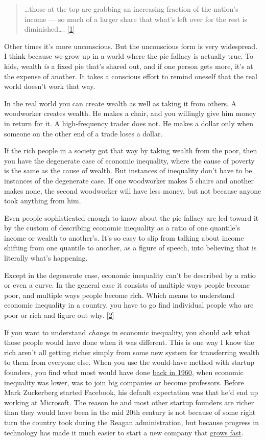 \begin{quote}
\ldots those at the top are grabbing an increasing fraction of the
nation's income --- so much of a larger share that what's left over for
the rest is diminished\ldots. {[}\hyperref[f1n]{1}{]}
\end{quote}

Other times it's more unconscious. But the unconscious form is very
widespread. I think because we grow up in a world where the pie fallacy
is actually true. To kids, wealth \emph{is} a fixed pie that's shared
out, and if one person gets more, it's at the expense of another. It
takes a conscious effort to remind oneself that the real world doesn't
work that way.

In the real world you can create wealth as well as taking it from
others. A woodworker creates wealth. He makes a chair, and you willingly
give him money in return for it. A high-frequency trader does not. He
makes a dollar only when someone on the other end of a trade loses a
dollar.

If the rich people in a society got that way by taking wealth from the
poor, then you have the degenerate case of economic inequality, where
the cause of poverty is the same as the cause of wealth. But instances
of inequality don't have to be instances of the degenerate case. If one
woodworker makes 5 chairs and another makes none, the second woodworker
will have less money, but not because anyone took anything from him.

Even people sophisticated enough to know about the pie fallacy are led
toward it by the custom of describing economic inequality as a ratio of
one quantile's income or wealth to another's. It's so easy to slip from
talking about income shifting from one quantile to another, as a figure
of speech, into believing that is literally what's happening.

Except in the degenerate case, economic inequality can't be described by
a ratio or even a curve. In the general case it consists of multiple
ways people become poor, and multiple ways people become rich. Which
means to understand economic inequality in a country, you have to go
find individual people who are poor or rich and figure out why.
{[}\hyperref[f2n]{2}{]}

If you want to understand \emph{change} in economic inequality, you
should ask what those people would have done when it was different. This
is one way I know the rich aren't all getting richer simply from some
new system for transferring wealth to them from everyone else. When you
use the would-have method with startup founders, you find what most
would have done \href{re.html}{back in 1960}, when economic inequality
was lower, was to join big companies or become professors. Before Mark
Zuckerberg started Facebook, his default expectation was that he'd end
up working at Microsoft. The reason he and most other startup founders
are richer than they would have been in the mid 20th century is not
because of some right turn the country took during the Reagan
administration, but because progress in technology has made it much
easier to start a new company that \href{growth.html}{grows fast}.

